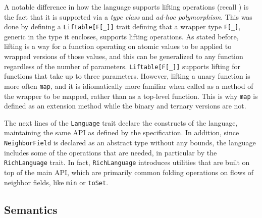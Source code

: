 A notable difference in how the language supports lifting operations (recall ) is the fact that it is supported via a \textit{type class} and \textit{ad-hoc polymorphism}.
%
This was done by defining a \texttt{Liftable[F[\_]]} trait defining that a wrapper type \texttt{F[\_]}, generic in the type it encloses, supports lifting operations.
%
As stated before, lifting is a way for a function operating on atomic values to be applied to wrapped versions of those values, and this can be generalized to any function regardless of the number of parameters.
%
\texttt{Liftable[F[\_]]} supports lifting for functions that take up to three parameters.
%
However, lifting a unary function is more often \texttt{map}, and it is idiomatically more familiar when called as a method of the wrapper to be mapped, rather than as a top-level function.
%
This is why \texttt{map} is defined as an extension method while the binary and ternary versions are not.

The next lines of the \texttt{Language} trait declare the constructs of the language, maintaining the same API as defined by the specification.
%
In addition, since \texttt{NeighborField} is declared as an abstract type without any bounds, the language includes some of the operations that are needed, in particular by the \texttt{RichLanguage} trait.
%
In fact, \texttt{RichLanguage} introduces utilities that are built on top of the main API, which are primarily common folding operations on flows of neighbor fields, like \texttt{min} or \texttt{toSet}.

\subsection{Semantics}

